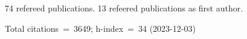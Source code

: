 74 refereed publications. 13 refeered publications as first author.

Total citations~=~3649; h-index~=~34 (2023-12-03)